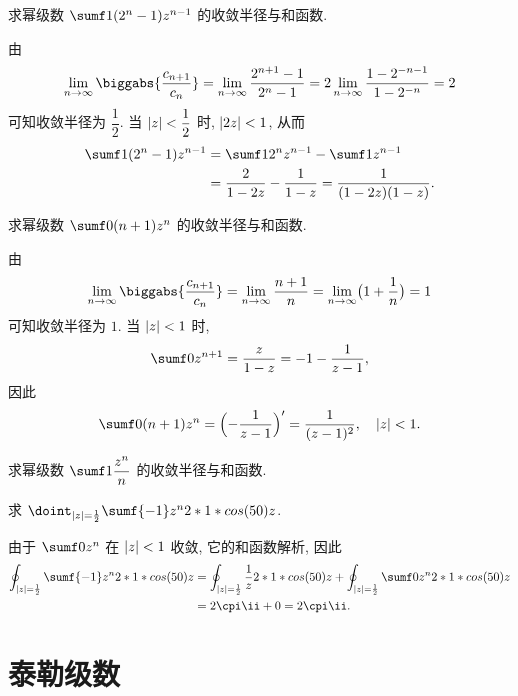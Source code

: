 \begin{example}
  求幂级数 $\sumf1 (2^n-1)z^{n-1}$ 的收敛半径与和函数.
\end{example}

\begin{solution}
  由
  \[
     \lim_{n\ra\infty}\biggabs{\frac{c_{n+1}}{c_n}}
    =\lim_{n\ra\infty}\frac{2^{n+1}-1}{2^n-1}
    =2\lim_{n\ra\infty}\frac{1-2^{-n-1}}{1-2^{-n}}
    =2
  \]
  可知收敛半径为 $\dfrac12$.
  当 $\left|z\right|<\dfrac12$ 时, $\left|2z\right|<1$, 从而
  \begin{align*}
     \sumf1 (2^n-1)z^{n-1}&
    =\sumf1 2^n z^{n-1}-\sumf1 z^{n-1}\\&
    =\frac2{1-2z}-\frac1{1-z}
    =\frac1{(1-2z)(1-z)}.
  \end{align*}
\end{solution}

\begin{example}
  求幂级数 $\sumf0 (n+1)z^n$ 的收敛半径与和函数.
\end{example}

\begin{solution}
  由
  \[
     \lim_{n\ra\infty}\biggabs{\frac{c_{n+1}}{c_n}}
    =\lim_{n\ra\infty}\frac{n+1}n
    =\lim_{n\ra\infty}\bigl(1+\frac1n\bigr)
    =1
  \]
  可知收敛半径为 $1$.
  当 $\left|z\right|<1$ 时,
  \[
     \sumf0 z^{n+1}
    =\frac z{1-z}
    =-1-\frac1{z-1},
  \]
  因此
  \[
     \sumf0 (n+1)z^n
    =\Bigl(-\frac1{z-1}\Bigr)'
    =\frac1{(z-1)^2},
      \quad \abs{z}<1.
  \]
\end{solution}

\begin{exercise}
  求幂级数 $\sumf1 \dfrac{z^n}n$ 的收敛半径与和函数.
\end{exercise}

\begin{example}
  求 $\doint_{\abs{z}=\half} \sumf{-1} z^n\d z$.
\end{example}

\begin{solution}
  由于 $\sumf0 z^n$ 在 $\left|z\right|<1$ 收敛, 它的和函数解析, 因此
  \begin{align*}
     \oint_{\abs{z}=\half} \sumf{-1} z^n\d z&
    =\oint_{\abs{z}=\half}\frac1z\d z
      +\oint_{\abs{z}=\half} \sumf0 z^n\d z\\&
    =2\cpi\ii +0
    =2\cpi\ii.
  \end{align*}
\end{solution}



\section{泰勒级数}

